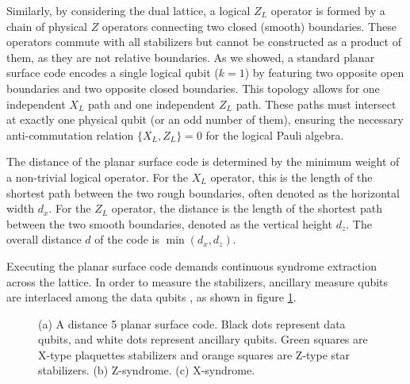\documentclass[12pt, twoside, openany]{book}
\begin{document}
Similarly, by considering the dual lattice, a logical $Z_L$ operator is formed by a chain of physical $Z$ operators connecting two closed (smooth) boundaries. These operators commute with all stabilizers but cannot be constructed as a product of them, as they are not relative boundaries. As we showed, a standard planar surface code encodes a single logical qubit ($k=1$) by featuring two opposite open boundaries and two opposite closed boundaries. This topology allows for one independent $X_L$ path and one independent $Z_L$ path. These paths must intersect at exactly one physical qubit (or an odd number of them), ensuring the necessary anti-commutation relation $\{X_L, Z_L\} = 0$ for the logical Pauli algebra.

The distance of the planar surface code is determined by the minimum weight of a non-trivial logical operator. For the $X_L$ operator, this is the length of the shortest path between the two rough boundaries, often denoted as the horizontal width $d_x$. For the $Z_L$ operator, the distance is the length of the shortest path between the two smooth boundaries, denoted as the vertical height $d_z$. The overall distance $d$ of the code is $\min(d_x, d_z)$. 

Executing the planar surface code demands continuous syndrome extraction across the lattice. In order to measure the stabilizers, ancillary measure qubits are interlaced among the data qubits \cite{Fowler2012}, as shown in figure \ref{fig:ancilla_surface_code}.

\begin{figure}[!ht] 
    \centering
    
    \begin{subfigure}[b]{0.5\textwidth} 
        \centering
        \resizebox{\linewidth}{!}{}
        \caption{}
        \label{fig:ancilla_surface_code}
    \end{subfigure}
    
    \vspace{1em} 
    
    \begin{subfigure}[b]{0.45\textwidth}
        \centering
        \resizebox{\linewidth}{!}{}
        \caption{}
        \label{fig:z-syndrome}
    \end{subfigure}
    \hfill
    \begin{subfigure}[b]{0.45\textwidth}
        \centering
        \resizebox{\linewidth}{!}{}
        \caption{}
        \label{fig:x-syndrome}
    \end{subfigure}
    
    \caption{(a) A distance 5 planar surface code. Black dots represent data qubits, and white dots represent ancillary qubits. Green squares are X-type plaquettes stabilizers and orange squares are Z-type star stabilizers. (b) Z-syndrome. (c) X-syndrome.}
    \label{fig:surface_code_full}
\end{figure}
\end{document}
